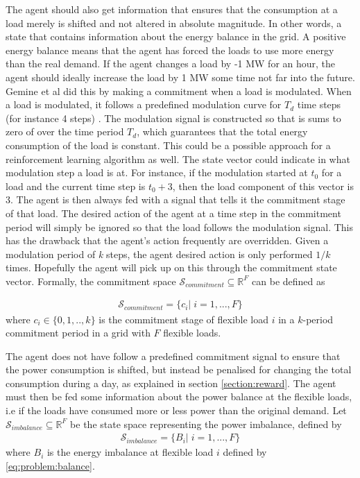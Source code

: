\documentclass[class=book, crop=false]{standalone}
\begin{document}
The agent should also get information that ensures that the consumption at a load merely is shifted and not altered in absolute magnitude. In other words, a state that contains information about the energy balance in the grid. A positive energy balance means that the agent has forced the loads to use more energy than the real demand. If the agent changes a load by -1 MW for an hour, the agent should ideally increase the load by 1 MW some time not far into the future. Gemine et al did this by making a commitment when a load is modulated. When a load is modulated, it follows a predefined modulation curve for $T_{d}$ time steps (for instance 4 steps) \cite{active_network_management}. The modulation signal is constructed so that is sums to zero of over the time period $T_{d}$, which guarantees that the total energy consumption of the load is constant. This could be a possible approach for a reinforcement learning algorithm as well. The state vector could indicate in what modulation step a load is at. For instance, if the modulation started at $t_{0}$ for a load and the current time step is $t_{0} + 3$, then the load component of this vector is 3. The agent is then always fed with a signal that tells it the commitment stage of that load. The desired action of the agent at a time step in the commitment period will simply be ignored so that the load follows the modulation signal. This has the drawback that the agent's action frequently are overridden. Given a modulation period of \textit{k} steps, the agent desired action is only performed $1/k$ times. Hopefully the agent will pick up on this through the commitment state vector. Formally, the commitment space $\mathcal{S}_{commitment} \subseteq \mathbb{R}^{F}$ can be defined as



\begin{equation}
   \begin{aligned}
   \label{eq:problem:commitment_state}
\mathcal{S}_{commitment} = \{ c_{i} | \;i = 1,...,F\}
    \end{aligned} 
\end{equation}
where $c_{i} \in \{0,1,..,k\}$ is the commitment stage of flexible load $i$ in a $k$-period commitment period in a grid with $F$ flexible loads.

The agent does not have follow a predefined commitment signal to ensure that the power consumption is shifted, but instead be penalised for changing the total consumption during a day, as explained in section \ref{section:reward}. The agent must then be fed some information about the power balance at the flexible loads, i.e if the loads have consumed more or less power than the original demand. Let  $\mathcal{S}_{imbalance} \subseteq \mathbb{R}^{F}$  be the state space representing the power imbalance, defined by \begin{equation}
   \begin{aligned}
   \label{eq:problem:imbalance_state}
\mathcal{S}_{imbalance} = \{ B_{i} |\; i = 1,...,F\}
    \end{aligned} 
\end{equation}
where $B_{i}$ is the energy imbalance at flexible load $i$ defined by \eqref{eq:problem:balance}.
\end{document}
